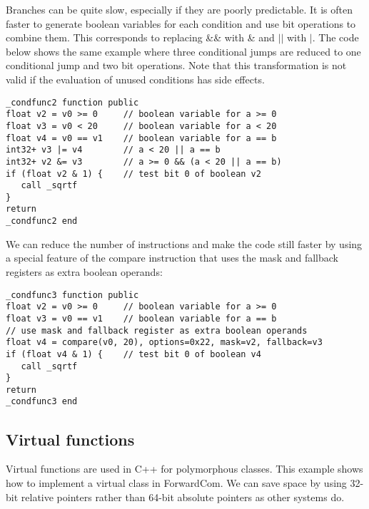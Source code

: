 \documentclass[forwardcom.tex]{subfiles}
\begin{document}
Branches can be quite slow, especially if they are poorly predictable. 
It is often faster to generate boolean variables for each condition and use bit operations to combine them. 
This corresponds to replacing \&\& with \& and $\vert\vert$ with $\vert$. 
The code below shows the same example where three conditional jumps are reduced to one conditional jump and two bit operations.
Note that this transformation is not valid if the evaluation of unused conditions has side effects.

\begin{example}
\label{exampleBooleanOperations2}
\end{example}
\begin{lstlisting}[frame=single]
_condfunc2 function public
float v2 = v0 >= 0     // boolean variable for a >= 0
float v3 = v0 < 20     // boolean variable for a < 20
float v4 = v0 == v1    // boolean variable for a == b
int32+ v3 |= v4        // a < 20 || a == b
int32+ v2 &= v3        // a >= 0 && (a < 20 || a == b)
if (float v2 & 1) {    // test bit 0 of boolean v2
   call _sqrtf
}
return
_condfunc2 end
\end{lstlisting}
\vspace{4mm}

We can reduce the number of instructions and make the code still faster by using
a special feature of the compare instruction that uses the mask and fallback registers
as extra boolean operands:

\begin{example}
\label{exampleBooleanOperations3}
\end{example}
\begin{lstlisting}[frame=single]
_condfunc3 function public
float v2 = v0 >= 0     // boolean variable for a >= 0
float v3 = v0 == v1    // boolean variable for a == b
// use mask and fallback register as extra boolean operands
float v4 = compare(v0, 20), options=0x22, mask=v2, fallback=v3
if (float v4 & 1) {    // test bit 0 of boolean v4
   call _sqrtf
}
return
_condfunc3 end
\end{lstlisting}
\vspace{4mm}


\subsection{Virtual functions} \label{virtualFunctions}
Virtual functions are used in C++ for polymorphous classes.
This example shows how to implement a virtual class in ForwardCom.
We can save space by using 32-bit relative pointers rather than 64-bit absolute pointers as other systems do.
\vspace{2mm}
\end{document}
